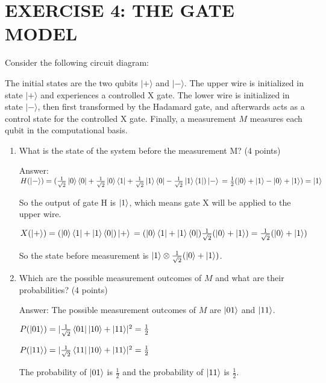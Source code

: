 \documentclass{article}
\begin{document}
\section{EXERCISE 4: THE GATE MODEL}
Consider the following circuit diagram:

The initial states are the two qubits $|+\rangle$ and $|-\rangle$. The upper wire is initialized in state $|+\rangle$ and experiences a controlled X gate. The lower wire is initialized in state $|-\rangle$, then first transformed by the Hadamard gate, and afterwards acts as a control state for the controlled X gate. Finally, a measurement $M$ measures each qubit in the computational basis.
\begin{enumerate}
    \item What is the state of the system before the measurement M? (4 points)

          Answer: $H(\ket{-})=(\frac{1}{\sqrt{2}}\ket{0}\bra{0}+\frac{1}{\sqrt{2}}\ket{0}\bra{1}+\frac{1}{\sqrt{2}}\ket{1}\bra{0}-\frac{1}{\sqrt{2}}\ket{1}\bra{1})\ket{-}
              \\=\frac{1}{2}(\ket{0}+\ket{1}-\ket{0}+\ket{1})
              \\=\ket{1}$

          So the output of gate H is $\ket{1}$, which means gate X will be applied to the upper wire.

          $X(\ket{+})=(\ket{0}\bra{1}+\ket{1}\bra{0})\ket{+}
              \\=(\ket{0}\bra{1}+\ket{1}\bra{0})\frac{1}{\sqrt{2}}(\ket{0}+\ket{1})
              \\=\frac{1}{\sqrt{2}}(\ket{0}+\ket{1})
          $

          So the state before measurement is $\ket{1} \otimes \frac{1}{\sqrt{2}}(\ket{0}+\ket{1})$.


    \item Which are the possible measurement outcomes of $M$ and what are their probabilities? (4 points)

          Answer: The possible measurement outcomes of $M$ are $\ket{01}$ and $\ket{11}$.

          $P(\ket{01})=|\frac{1}{\sqrt{2}}\bra{01}{\ket{10}+\ket{11}}|^2
              =\frac{1}{2}
          $

          $P(\ket{11})=|\frac{1}{\sqrt{2}}\bra{11}{\ket{10}+\ket{11}}|^2
              =\frac{1}{2}
          $

          The probability of $\ket{01}$ is $\frac{1}{2}$ and the probability of $\ket{11}$ is $\frac{1}{2}$.




\end{enumerate}
\end{document}
